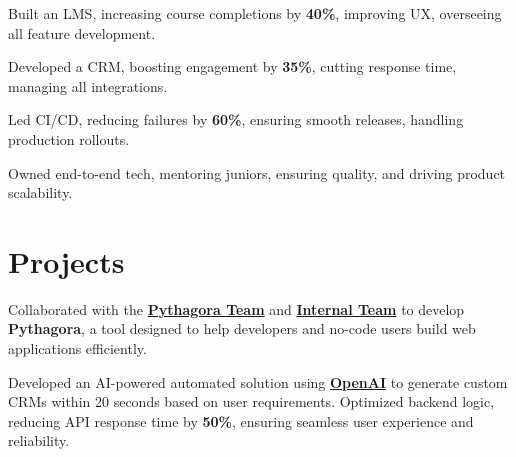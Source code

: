 \documentclass[]{deedy-resume-openfont}
\begin{document}
\begin{minipage}[t]{0.66\textwidth}
    \begin{tightemize}  
        \item Built an LMS, increasing course completions by \textbf{40\%}, improving UX, overseeing all feature development.  
        \item Developed a CRM, boosting engagement by \textbf{35\%}, cutting response time, managing all integrations.  
        \item Led CI/CD, reducing failures by \textbf{60\%}, ensuring smooth releases, handling production rollouts.  
        \item Owned end-to-end tech, mentoring juniors, ensuring quality, and driving product scalability.  
    \end{tightemize}  
    \sectionsep  




    \section{Projects}
    \vspace{0.5em}

    \vspace{0.2em}

    Collaborated with the \textbf{\href{https://pythagora.ai/}{Pythagora Team}} and \textbf{\href{https://www.lnwebworks.com/}{Internal Team}} to develop \textbf{Pythagora}, a tool designed to help developers and no-code users build web applications efficiently.
    \sectionsep

    \vspace{0.2em}  
    
    Developed an AI-powered automated solution using \textbf{\href{http://openai.com/}{OpenAI}} to generate custom CRMs within 20 seconds based on user requirements.  
    Optimized backend logic, reducing API response time by \textbf{50\%}, ensuring seamless user experience and reliability.  
    \sectionsep  
    

\end{minipage}
\end{document}
